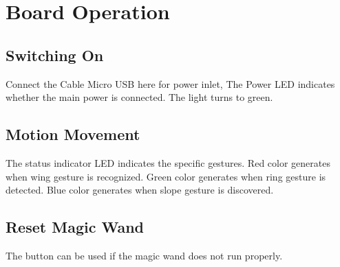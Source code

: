 %
%
%



\chapter{Board Operation}

\section{Switching On}
Connect the Cable Micro USB here for power inlet, The Power LED indicates whether the main power is connected. The light turns to green.

\section{Motion Movement}
The status indicator LED indicates the specific gestures. Red color generates when wing gesture is recognized. Green color generates when ring gesture is detected. Blue color generates when slope gesture is discovered. 

\section{Reset Magic Wand}
The button can be used if the magic wand does not run properly.



